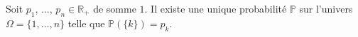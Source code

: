 Soit $p_1$, ..., $p_n\in\mathbb{R}_+$ de somme $1$. Il existe une unique probabilité $\mathbb{P}$ sur l'univers $\Omega=\{1,\ldots,n\}$ telle que $\mathbb{P}(\{k\})=p_k$.

\begin{reponses}
\end{reponses}

